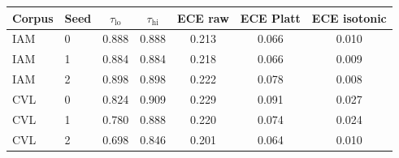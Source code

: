 \begin{tabular}{llccccc}
\toprule
Corpus & Seed & $\tau_{\mathrm{lo}}$ & $\tau_{\mathrm{hi}}$ & ECE raw & ECE Platt & ECE isotonic \\
\midrule
IAM & 0 & 0.888 & 0.888 & 0.213 & 0.066 & 0.010 \\
IAM & 1 & 0.884 & 0.884 & 0.218 & 0.066 & 0.009 \\
IAM & 2 & 0.898 & 0.898 & 0.222 & 0.078 & 0.008 \\
\midrule
CVL & 0 & 0.824 & 0.909 & 0.229 & 0.091 & 0.027 \\
CVL & 1 & 0.780 & 0.888 & 0.220 & 0.074 & 0.024 \\
CVL & 2 & 0.698 & 0.846 & 0.201 & 0.064 & 0.010 \\
\bottomrule
\end{tabular}

